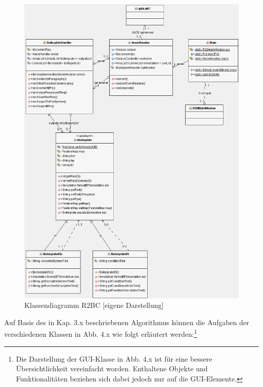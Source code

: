 \documentclass[12pt]{report}
\begin{document}
\begin{figure}[H]
\begin{center}
\includegraphics[scale=0.57]{Bilder/r2bc-klassen.png}
\caption{Klassendiagramm R2BC [eigene Darstellung]}
\end{center}
\end{figure}

Auf Basis des in Kap. 3.x beschriebenen Algorithmus können die Aufgaben der verschiedenen Klassen in Abb. 4.x wie folgt erläutert werden:\footnote{Die Darstellung der GUI-Klasse in Abb. 4.x ist für eine bessere Übersichtlichkeit vereinfacht worden. Enthaltene Objekte und Funktionalitäten beziehen sich dabei jedoch nur auf die GUI-Elemente.}
\end{document}
